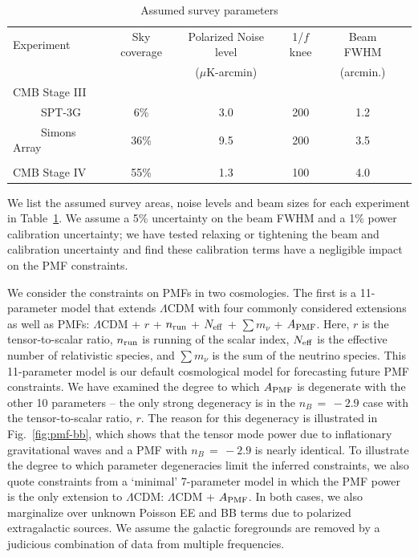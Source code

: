 \documentclass[apj]{emulateapj}
\newcommand{\apmf}{\ensuremath{A_{\rm PMF}}}
\newcommand{\lcdm}{\ensuremath{\Lambda}CDM}
\newcommand{\nrun}{\ensuremath{n_{\rm run}}}
\newcommand{\neff}{\ensuremath{N_{\rm eff}}}
\newcommand{\mnu}{\ensuremath{\sum m_\nu}}
\begin{document}
\begin{table}[tbh]
\begin{center}
\caption{\label{tab:experiments} Assumed survey parameters}
\small
\begin{tabular}{l || c c c c c }
Experiment & Sky coverage & Polarized Noise level  & 1/$f$ knee & Beam FWHM \\
& &($\mu$K-arcmin)&&(arcmin.)\\
\hline
CMB Stage III & & & & \\

~~~~~SPT-3G & 6\% & 3.0 & 200 & 1.2 \\
~~~~~Simons Array & 36\% & 9.5 & 200 & 3.5 \\ 
\\
CMB Stage IV & 55\% & 1.3 & 100 & 4.0 \\
\end{tabular}
 \normalsize
\end{center}
\end{table}


We list the assumed survey areas, noise levels and beam sizes for each experiment in Table~\ref{tab:experiments}. 
We  assume a 5\% uncertainty on the beam FWHM and a 1\% power calibration uncertainty; we have tested relaxing or tightening the beam and calibration uncertainty and find these calibration terms have a negligible impact on the PMF constraints. 


We consider the constraints on PMFs in two cosmologies. 
The first is a 11-parameter model that extends \lcdm{} with  four  commonly considered extensions as well as PMFs:  \lcdm{} +  $r$ + \nrun{} +  \neff{} + \mnu{} + \apmf. 
Here, $r$ is the tensor-to-scalar ratio, \nrun{} is running of the scalar index, \neff{} is the effective number of relativistic species, and \mnu{} is the sum of the neutrino species. 
This 11-parameter model is our default cosmological model for forecasting future PMF constraints. 
We have examined the degree to which \apmf{} is degenerate with the other 10 parameters -- the only strong degeneracy is in the $n_B\,=\,-2.9$ case with the tensor-to-scalar ratio, $r$. 
The reason for this degeneracy is illustrated in Fig.~\ref{fig:pmf-bb}, which shows that the tensor mode power due to inflationary gravitational waves and a PMF with $n_B\,=\,-2.9$ is nearly identical. 
To illustrate the degree to which parameter degeneracies limit the inferred constraints,  we also quote constraints from a `minimal' 7-parameter model in which the PMF power is the only extension to \lcdm{}:  \lcdm{} + \apmf.
In both cases, we also marginalize over unknown Poisson EE and BB  terms due to polarized extragalactic sources. 
We assume the galactic foregrounds are removed by a judicious combination of data from multiple frequencies. 
\end{document}
